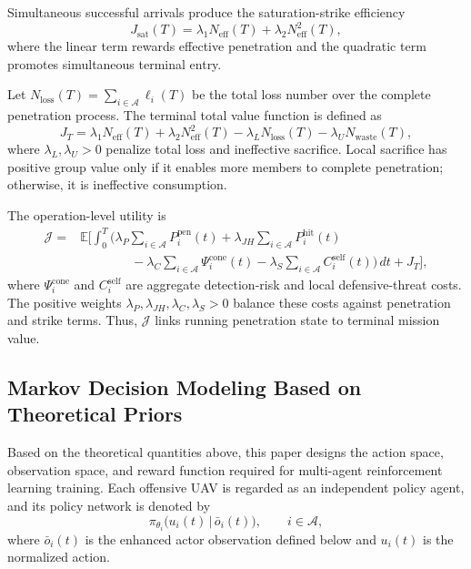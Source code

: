 \documentclass{cja}
\begin{document}
Simultaneous successful arrivals produce the saturation-strike efficiency
\begin{equation}
J_{\mathrm{sat}}(T)
=
\lambda_1 N_{\mathrm{eff}}(T)
+
\lambda_2 N_{\mathrm{eff}}^2(T),
\end{equation}
where the linear term rewards effective penetration and the quadratic term promotes simultaneous terminal entry.

Let $N_{\mathrm{loss}}(T)=\sum_{i\in\mathcal{A}}\ell_i(T)$ be the total loss number over the complete penetration process. The terminal total value function is defined as
\begin{equation}
J_T
=
\lambda_1 N_{\mathrm{eff}}(T)
+
\lambda_2 N_{\mathrm{eff}}^2(T)
-
\lambda_L N_{\mathrm{loss}}(T)
-
\lambda_U N_{\mathrm{waste}}(T),
\end{equation}
where $\lambda_L,\lambda_U>0$ penalize total loss and ineffective sacrifice. Local sacrifice has positive group value only if it enables more members to complete penetration; otherwise, it is ineffective consumption.

The operation-level utility is
\begin{equation}
\begin{aligned}
\mathcal J
={}&
\mathbb E\Biggl[
\int_0^T
\Biggl(
\lambda_P \sum_{i\in\mathcal{A}} P_i^{\mathrm{pen}}(t)
+
\lambda_{JH} \sum_{i\in\mathcal{A}} P_i^{\mathrm{hit}}(t)\\
&\qquad\qquad
-
\lambda_C \sum_{i\in\mathcal{A}} \Psi_i^{\mathrm{cone}}(t)
-
\lambda_S \sum_{i\in\mathcal{A}} C_i^{\mathrm{self}}(t)
\Biggr)\,dt
+
J_T
\Biggr],
\end{aligned}
\end{equation}
where $\Psi_i^{\mathrm{cone}}$ and $C_i^{\mathrm{self}}$ are aggregate detection-risk and local defensive-threat costs. The positive weights $\lambda_P,\lambda_{JH},\lambda_C,\lambda_S>0$ balance these costs against penetration and strike terms. Thus, $\mathcal J$ links running penetration state to terminal mission value.

\subsection{Markov Decision Modeling Based on Theoretical Priors}
\label{subsec:rl-design}

Based on the theoretical quantities above, this paper designs the action space, observation space, and reward function required for multi-agent reinforcement learning training. Each offensive UAV is regarded as an independent policy agent, and its policy network is denoted by
\begin{equation}
\pi_{\theta_i}\bigl(u_i(t)\,\big|\,\bar o_i(t)\bigr),\qquad i\in\mathcal{A},
\end{equation}
where $\bar o_i(t)$ is the enhanced actor observation defined below and $u_i(t)$ is the normalized action.
\end{document}
